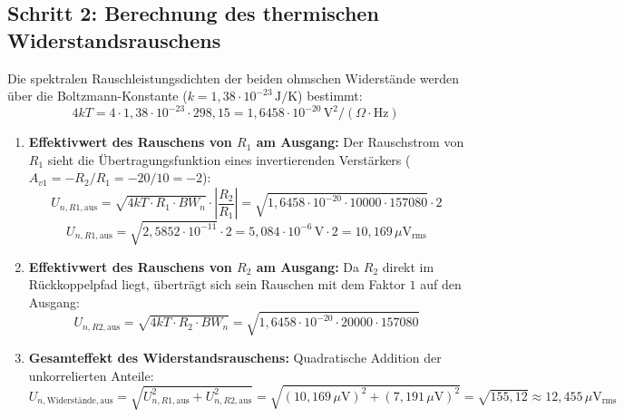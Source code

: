 \documentclass[11pt,a4paper]{article}
\begin{document}
\subsection{Schritt 2: Berechnung des thermischen Widerstandsrauschens}
Die spektralen Rauschleistungsdichten der beiden ohmschen Widerstände werden über die Boltzmann-Konstante ($k = 1{,}38 \cdot 10^{-23}\,\text{J/K}$) bestimmt:
\begin{equation}
4kT = 4 \cdot 1{,}38 \cdot 10^{-23} \cdot 298{,}15 = 1{,}6458 \cdot 10^{-20}\,\text{V}^2/(\Omega \cdot \text{Hz})
\end{equation}
\begin{enumerate}
    \item \textbf{Effektivwert des Rauschens von $R_1$ am Ausgang:} Der Rauschstrom von $R_1$ sieht die Übertragungsfunktion eines invertierenden Verstärkers ($A_{v1} = -R_2/R_1 = -20/10 = -2$):
    \begin{equation}
    U_{n,R1,\text{aus}} = \sqrt{4kT \cdot R_1 \cdot BW_n} \cdot \left| \frac{R_2}{R_1} \right| = \sqrt{1{,}6458 \cdot 10^{-20} \cdot 10000 \cdot 157080} \cdot 2
    \end{equation}
    \begin{equation}
    U_{n,R1,\text{aus}} = \sqrt{2{,}5852 \cdot 10^{-11}} \cdot 2 = 5{,}084 \cdot 10^{-6}\,\text{V} \cdot 2 = 10{,}169\,\mu\text{V}_{\text{rms}}
    \end{equation}
    \item \textbf{Effektivwert des Rauschens von $R_2$ am Ausgang:} Da $R_2$ direkt im Rückkoppelpfad liegt, überträgt sich sein Rauschen mit dem Faktor $1$ auf den Ausgang:
    \begin{equation}
    U_{n,R2,\text{aus}} = \sqrt{4kT \cdot R_2 \cdot BW_n} = \sqrt{1{,}6458 \cdot 10^{-20} \cdot 20000 \cdot 157080}
    \end{equation}
    \item \textbf{Gesamteffekt des Widerstandsrauschens:} Quadratische Addition der unkorrelierten Anteile:
    \begin{equation}
    U_{n,\text{Widerstände},\text{aus}} = \sqrt{U_{n,R1,\text{aus}}^2 + U_{n,R2,\text{aus}}^2} = \sqrt{(10{,}169\,\mu\text{V})^2 + (7{,}191\,\mu\text{V})^2} = \sqrt{155{,}12} \approx 12{,}455\,\mu\text{V}_{\text{rms}}
    \end{equation}
\end{enumerate}
\end{document}
